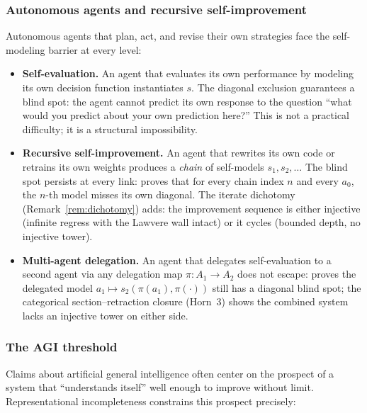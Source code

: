 \documentclass[11pt]{article}
\begin{document}
\subsubsection{Autonomous agents and recursive self-improvement}

Autonomous agents that plan, act, and revise their own strategies face
the self-modeling barrier at every level:

\begin{itemize}[leftmargin=1.5em,itemsep=0.2ex,topsep=0.4ex,parsep=0pt]
\item \textbf{Self-evaluation.}  An agent that evaluates its own
  performance by modeling its own decision function instantiates $s$.
  The diagonal exclusion guarantees a blind spot: the agent cannot
  predict its own response to the question ``what would you predict
  about your own prediction here?''  This is not a practical
  difficulty; it is a structural impossibility.
\item \textbf{Recursive self-improvement.}  An agent that rewrites
  its own code or retrains its own weights produces a \emph{chain}
  of self-models $s_1, s_2, \ldots$  The blind spot persists at
  every link:
   proves that
  for every chain index $n$ and every $a_0$, the $n$-th model
  misses its own diagonal.  The iterate dichotomy
  (Remark~\ref{rem:dichotomy}) adds: the improvement
  sequence is either injective (infinite regress with the
  Lawvere wall intact) or it cycles (bounded depth,
  no injective tower).
\item \textbf{Multi-agent delegation.}  An agent that delegates
  self-evaluation to a second agent via any delegation map
  $\pi : A_1 \to A_2$ does not escape:
   proves the
  delegated model $a_1 \mapsto s_2(\pi(a_1), \pi(\cdot))$ still
  has a diagonal blind spot; the categorical
  section--retraction closure (Horn~3) shows the combined system
  lacks an injective tower on either side.
\end{itemize}

\subsubsection{The AGI threshold}

Claims about artificial general intelligence often center on the
prospect of a system that ``understands itself'' well enough to
improve without limit.  Representational incompleteness constrains
this prospect precisely:
\end{document}
